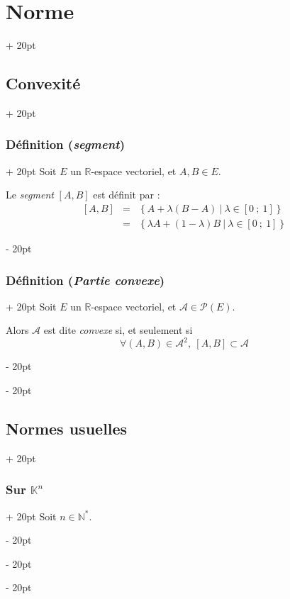 \documentclass[a4paper, 12pt, twoside]{article}
\newcommand{\N}{\mathbb{N}} %
\newcommand{\R}{\mathbb{R}} %
\newcommand{\K}{\mathbb K}
\newcommand{\seg}[2]{\left[ #1\ ;\ #2 \right]}
\newcommand{\set}[1]{\left\{ #1 \right\}}
\newcommand{\ind}[1][20pt]{\advance\leftskip + #1}
\newcommand{\deind}[1][20pt]{\advance\leftskip - #1}
\newenvironment{indt}[2][20pt]{#2 \par \ind[#1]}{\par \deind} %
\begin{document}
\begin{indt}{\section{Norme}}
        \begin{indt}{\subsection{Convexité}}
            \begin{indt}{\subsubsection{Définition (\textit{segment})}}
                Soit $E$ un $\R$-espace vectoriel, et $A, B \in E$.
                
                Le \emph{segment} $[A, B]$ est définit par :
                \[
                    \begin{array}{rcl}
                        [A, B] &=& \set{A + \lambda(B - A) \ |\ \lambda \in \seg 0 1}
                        \\
                               &=& \set{\lambda A + (1 - \lambda)B\ |\ \lambda \in \seg 0 1}
                    \end{array}
                \]
            \end{indt}

            \vspace{12pt}
            
            \begin{indt}{\subsubsection{Définition (\textit{Partie convexe})}}
                Soit $E$ un $\R$-espace vectoriel, et $\mathcal A \in \mathcal P(E)$.

                Alors $\mathcal A$ est dite \emph{convexe} si, et seulement si
                \[
                    \forall (A, B) \in \mathcal A^2,\ [A, B] \subset \mathcal A
                \]
            \end{indt}
        \end{indt}

        \vspace{12pt}
        
        \begin{indt}{\subsection{Normes usuelles}}
            \begin{indt}{\subsubsection{Sur $\K^n$}}
                Soit $n \in \N^*$.


\end{indt}
\end{indt}
\end{indt}
\end{document}
